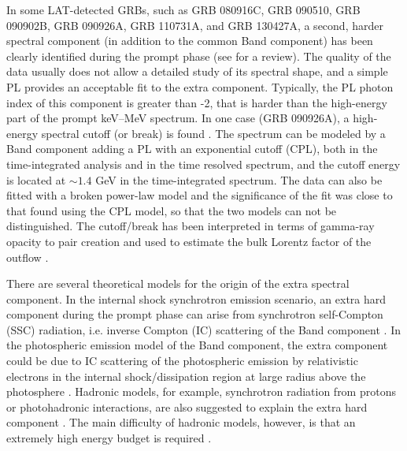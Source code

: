 \documentclass[twocolumn]{aastex631}
\begin{document}
In some LAT-detected GRBs, such as GRB 080916C,  GRB 090510, GRB 090902B, GRB 090926A,  GRB 110731A, and GRB 130427A, a second, harder spectral component (in addition to the common Band component) has been
clearly identified during the prompt phase (see \citet{2018IJMPD..2742003N} for a review). The quality of the data usually does not
allow a detailed study of its spectral shape, and a simple PL provides an acceptable fit to the extra component. Typically, the PL photon
index of this component is greater than -2, that is harder than the high-energy part of the
prompt keV–MeV spectrum.  In one case (GRB 090926A), a high-energy spectral cutoff (or break) is found \citep{2011ApJ...729..114A}. The spectrum can be modeled by a Band component adding a PL with an exponential cutoff (CPL),  both in the time-integrated analysis and in the time resolved spectrum, and the cutoff energy is located at
$\sim 1.4$ GeV in the time-integrated spectrum. The data can also be fitted with a broken power-law model and the significance of the
fit was close to that found using the CPL model, so that
the two models can not be distinguished. The cutoff/break has been interpreted in terms of gamma-ray opacity to pair creation and used to estimate the bulk Lorentz factor of the outflow \citep{2011ApJ...729..114A}. 

There are several theoretical models for the origin of the extra spectral component. 
In the internal shock synchrotron emission scenario, an extra hard component during the prompt phase can arise from synchrotron self-Compton (SSC) radiation, i.e. inverse Compton (IC) scattering of the Band component \citep[e.g.,][]{2014A&A...568A..45B}. In the photospheric emission model of the Band component, the extra component
could be due to IC scattering of the photospheric emission by relativistic electrons in the internal shock/dissipation region at large radius above the photosphere \citep{2009ApJ...703.1044B,2009ApJ...706L..33G,2010ApJ...709L.172R,2011MNRAS.415.1663T}. 
Hadronic models, for example, synchrotron radiation from protons or photohadronic interactions, are also suggested to explain the extra hard component \citep[e.g.,][]{2009ApJ...705L.191A}. The
main difficulty of hadronic models, however, is that an  extremely high  energy budget is required \citep{2009ApJ...698L..98W}.

\end{document}
